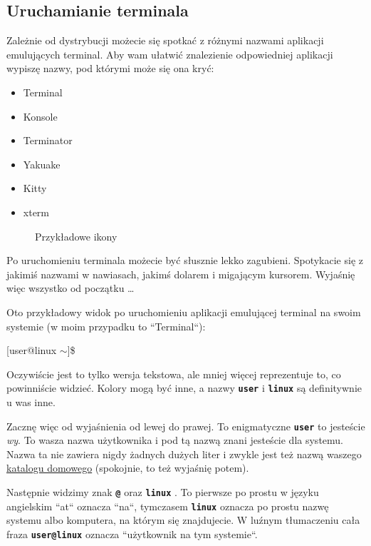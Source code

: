 \documentclass[12pt]{article}
\makeatletter
\newcommand{\ttbf}[1]{
    \texttt{\textbf{#1}}
}
\newenvironment{console1}
{
    \ttfamily
    \fontseries{b}
    \selectfont
    {[}user@linux $\sim${]}\$} {

}
\makeatother
\begin{document}
\subsection{Uruchamianie terminala}

Zależnie od dystrybucji możecie się spotkać z różnymi nazwami aplikacji emulujących terminal. Aby wam ułatwić znalezienie odpowiedniej aplikacji wypiszę nazwy, pod którymi może się ona kryć:

\begin{itemize}
    \item Terminal
    \item Konsole
    \item Terminator
    \item Yakuake
    \item Kitty
    \item xterm
\end{itemize}

\begin{figure}[H]
    \centering
    \quad
    \subfloat['Konsole']{}
    \caption{Przykładowe ikony}
\end{figure}

Po uruchomieniu terminala możecie być słusznie lekko zagubieni. Spotykacie się z jakimiś nazwami w nawiasach, jakimś dolarem i migającym kursorem. Wyjaśnię więc wszystko od początku \dots

Oto przykładowy widok po uruchomieniu aplikacji emulującej terminal na swoim systemie (w moim przypadku to ``Terminal``):

\begin{console1}

\end{console1}

Oczywiście jest to tylko wersja tekstowa, ale mniej więcej reprezentuje to, co powinniście widzieć. Kolory mogą być inne, a nazwy \ttbf{user} i \ttbf{linux} są definitywnie u was inne.

Zacznę więc od wyjaśnienia od lewej do prawej. To enigmatyczne \ttbf{user} to jesteście \emph{wy}. To wasza nazwa użytkownika i pod tą nazwą znani jesteście dla systemu. Nazwa ta nie zawiera nigdy żadnych dużych liter i zwykle jest też nazwą waszego \hyperref[sec:homedir]{katalogu domowego} (spokojnie, to też wyjaśnię potem).

Następnie widzimy znak \ttbf{@} oraz \ttbf{linux}. To pierwsze po prostu w języku angielskim ``at`` oznacza ``na``, tymczasem \ttbf{linux} oznacza po prostu nazwę systemu albo komputera, na którym się znajdujecie. W luźnym tłumaczeniu cała fraza \ttbf{user@linux} oznacza ``użytkownik na tym systemie``.
\end{document}
